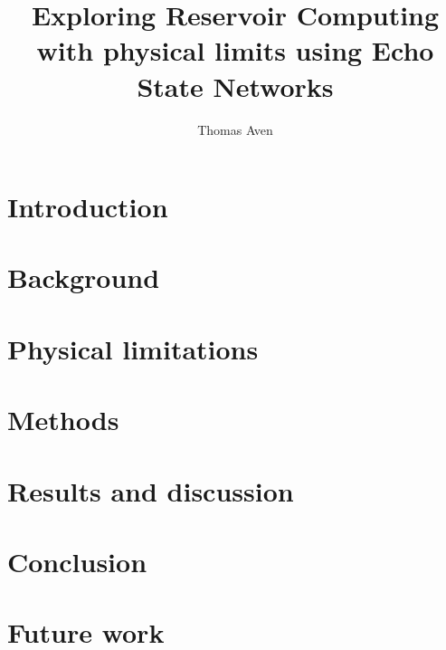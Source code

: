 \documentclass[journal]{IEEEtran}
\begin{document}
\title{Exploring Reservoir Computing with physical limits using Echo State Networks}
\author{Thomas Aven}
\date{}
\maketitle



\section{Introduction}


\section{Background}


\section{Physical limitations}


\section{Methods}


\section{Results and discussion}


\section{Conclusion}


\section{Future work}




\end{document}

